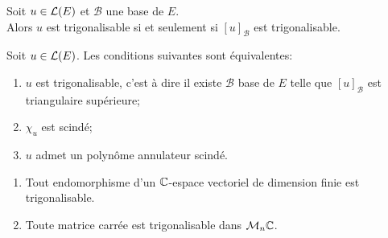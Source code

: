 \documentclass[a4paper]{book}
\begin{document}
\begin{Proposition}
Soit $u\in \mathcal{L}(E)$ et $\mathcal{B} $ une base de $E$.\\
Alors $u$ est trigonalisable si et seulement si $[u]_\mathcal{B} $ est trigonalisable.
\end{Proposition}
\begin{Theoreme}
Soit $u\in \mathcal{L}(E)$. Les conditions suivantes sont équivalentes:
\begin{enumerate}
\item $u$ est trigonalisable, c'est à dire  il existe $\mathcal{B} $ base de $E$ telle que $[u]_\mathcal{B} $ est triangulaire supérieure;
\item $\chi       _u$ est scindé;
\item $u$ admet un polynôme annulateur scindé.
\end{enumerate}
\end{Theoreme}
\begin{Corollaire}
\begin{enumerate}
\item Tout endomorphisme d'un $\mathbb{C}$-espace vectoriel de dimension finie est trigonalisable.
\item Toute matrice carrée est trigonalisable dans $\mathcal{M}_{n}{\mathbb{C}}$.
\end{enumerate}
\end{Corollaire}
\end{document}
